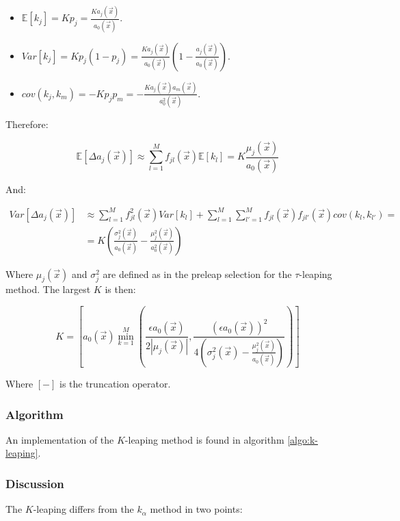     \begin{itemize}
      \item $\mathbb{E}[k_j] = Kp_j = \frac{Ka_j(\vec{x})}{a_0(\vec{x})}$.
      \item $Var[k_j] = Kp_j(1-p_j) = \frac{Ka_j(\vec{x})}{a_0(\vec{x})}\left(1-\frac{a_j(\vec{x})}{a_0(\vec{x})}\right)$.
      \item $cov(k_j, k_m) = -Kp_jp_m = -\frac{Ka_j(\vec{x})a_m(\vec{x})}{a_0^2(\vec{x})}$.
    \end{itemize}

    Therefore:

    $$\mathbb{E}[\Delta a_j(\vec{x})] \approx\sum\limits_{l=1}^Mf_{jl}(\vec{x})\mathbb{E}[k_l] = K\frac{\mu_j(\vec{x})}{a_0(\vec{x})}$$

    And:

    \begin{align*}
      Var[\Delta a_j(\vec{x})] &\approx \sum\limits_{l=1}^Mf_{jl}^2(\vec{x})Var[k_l] + \sum\limits_{l=1}^M\sum\limits_{l'=1}^Mf_{jl}(\vec{x})f_{jl'}(\vec{x})cov(k_l, k_{l'}) = \\
                               &= K\left(\frac{\sigma_j^2(\vec{x})}{a_0(\vec{x})}-\frac{\mu_j^2(\vec{x})}{a_0^2(\vec{x})}\right)
    \end{align*}

    Where $\mu_j(\vec{x})$ and $\sigma_j^2$ are defined as in the preleap selection for the $\tau$-leaping method.
    The largest $K$ is then:

    $$K = \left[a_0(\vec{x})\min\limits_{k=1}^M\left(\frac{\epsilon a_0(\vec{x})}{2|\mu_j(\vec{x})|}, \frac{(\epsilon a_0(\vec{x}))^2}{4\left(\sigma_j^2(\vec{x})-\frac{\mu_j^2(\vec{x})}{a_0(\vec{x})}\right)}\right)\right]$$

    Where $[-]$ is the truncation operator.

    \subsubsection{Algorithm}
    An implementation of the $K$-leaping method is found in algorithm \ref{algo:k-leaping}.

    

    \subsubsection{Discussion}
    The $K$-leaping differs from the $k_\alpha$ method in two points:

